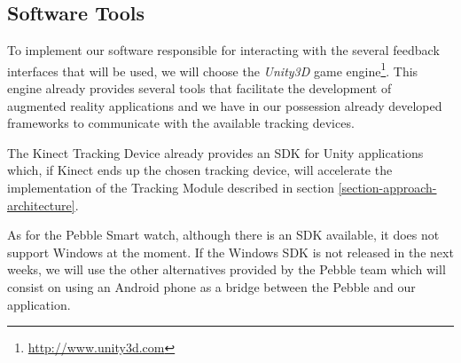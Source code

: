 \subsection{Software Tools}

To implement our software responsible for interacting with the several feedback interfaces that 
will be used, we will choose the \emph{Unity3D} game engine\footnote{\url{http://www.unity3d.com}}. 
This engine already provides several tools that facilitate the development of augmented reality applications and we have in our possession already developed frameworks to communicate with the available tracking devices.

The Kinect Tracking Device already provides an SDK for Unity applications which, if Kinect ends up the chosen tracking device, will accelerate the implementation of the Tracking Module described in section \ref{section-approach-architecture}.

As for the Pebble Smart watch, although there is an SDK available, it does not support Windows at the moment. If the Windows SDK is not released in the next weeks, we will use the other alternatives provided by the Pebble team which will consist on using an Android phone as a bridge between the Pebble and our application.